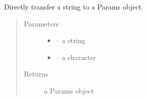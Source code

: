 \documentclass[letterpaper,10pt,english]{sphinxmanual}
\begin{document}
\begin{fulllineitems}
\label{\detokenize{index:dbm_py.interface.string_to_params}}
Directly transfer a string to a Params object.
\begin{quote}\begin{description}
\item[{Parameters}] \leavevmode\begin{itemize}
\item {} 
 -- a string

\item {} 
 -- a character

\end{itemize}

\item[{Returns}] \leavevmode
a Params object

\end{description}\end{quote}

\end{fulllineitems}




\renewcommand{\indexname}{Index}
\printindex
\end{document}
